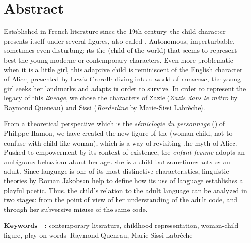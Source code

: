 \chapter*{Abstract}

\begin{spacing}{1.4}

Established in French literature since the 19th century, the child character presents itself under several figures, also called .
Autonomous, imperturbable, sometimes even disturbing: its the  (child of the world) that seems to represent best the young moderne or contemporary characters.
Even more problematic when it is a little girl, this adaptive child is reminiscent of the English character of Alice, presented by Lewis Carroll: diving into a world of nonsense, the young girl seeks her landmarks and adapts in order to survive.
In order to represent the legacy of this \textit{lineage}, we chose the characters of Zazie (\textit{Zazie dans le métro} by Raymond Queneau) and Sissi (\textit{Borderline} by Marie-Sissi Labrèche).
\par
From a theoretical perspective which is the \textit{sémiologie du personnage} () of Philippe Hamon, we have created the new figure of the  (woman-child, not to confuse with child-like woman), which is a way of revisiting the myth of Alice.
Pushed to empowerment by its context of existence, the \textit{enfant-femme} adopts an ambiguous behaviour about her age: she is a child but sometimes acts as an adult.
Since language is one of its most distinctive characteristics, linguistic theories by Roman Jakobson help to define how its use of language establishes a playful poetic.
Thus, the child's relation to the adult language can be analyzed in two stages: from the point of view of her understanding of the adult code, and through her subversive misuse of the same code.

\end{spacing}

\bigskip

\begin{singlespace}
\textbf{Keywords ~:}
contemporary literature, childhood representation, woman-child figure, play-on-words, Raymond Queneau, Marie-Sissi Labrèche
\end{singlespace}

